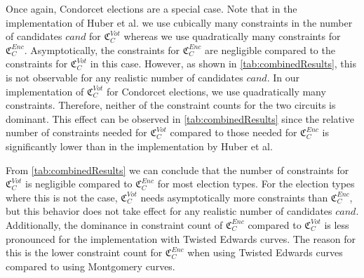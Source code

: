Once again, Condorcet elections are a special case.
Note that in the implementation of Huber et al. we use cubically many constraints in the number of candidates $cand$ for $\mathfrak{C}_C^{Vot}$ whereas we use quadratically many constraints for $\mathfrak{C}_C^{Enc}$.
Asymptotically, the constraints for $\mathfrak{C}_C^{Enc}$ are negligible compared to the constraints for $\mathfrak{C}_C^{Vot}$ in this case.
However, as shown in \cref{tab:combinedResults}, this is not observable for any realistic number of candidates $cand$.
In our implementation of $\mathfrak{C}_C^{Vot}$ for Condorcet elections, we use quadratically many constraints.
Therefore, neither of the constraint counts for the two circuits is dominant.
This effect can be observed in \cref{tab:combinedResults} since the relative number of constraints needed for $\mathfrak{C}_C^{Vot}$ compared to those needed for $\mathfrak{C}_C^{Enc}$ is significantly lower than in the implementation by Huber et al.

From \cref{tab:combinedResults} we can conclude that the number of constraints for $\mathfrak{C}_C^{Vot}$ is negligible compared to $\mathfrak{C}_C^{Enc}$ for most election types.
For the election types where this is not the case, $\mathfrak{C}_C^{Vot}$ needs asymptotically more constraints than $\mathfrak{C}_C^{Enc}$, but this behavior does not take effect for any realistic number of candidates $cand$.
Additionally, the dominance in constraint count of $\mathfrak{C}_C^{Enc}$ compared to $\mathfrak{C}_C^{Vot}$ is less pronounced for the implementation with Twisted Edwards curves.
The reason for this is the lower constraint count for $\mathfrak{C}_C^{Enc}$ when using Twisted Edwards curves compared to using Montgomery curves.


